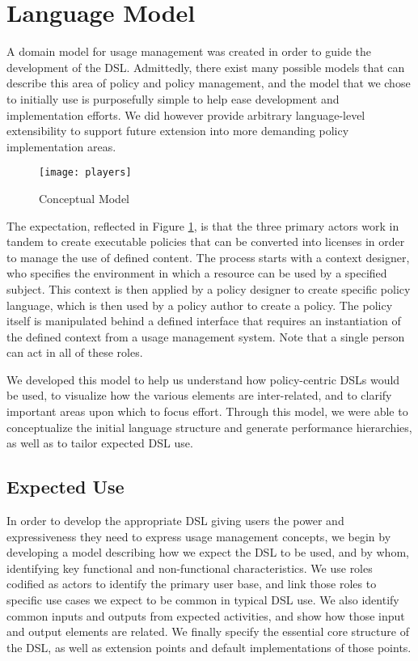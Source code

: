 \section{Language Model}\label{sec:model}
A domain model for usage management was created in order to guide the development of the DSL.  Admittedly, there exist many possible models that can describe this area of policy and policy management, and the model that we chose to initially use is purposefully simple to help ease development and implementation efforts.  We did however provide arbitrary language-level extensibility to support future extension into more demanding policy implementation areas.

\begin{figure}[!t]
\centering
\texttt{[image: players]}
\caption{Conceptual Model}
\label{fig:model:conceptual-model}
\end{figure}

The expectation, reflected in Figure \ref{fig:model:conceptual-model}, is that the three primary actors work in tandem to create executable policies that can be converted into licenses in order to manage the use of defined content.  The process starts with a context designer, who specifies the environment in which a resource can be used by a specified subject.  This context is then applied by a policy designer to create specific policy language, which is then used by a policy author to create a policy.  The policy itself is manipulated behind a defined interface that requires an instantiation of the defined context from a usage management system.  Note that a single person can act in all of these roles.

We developed this model to help us understand how policy-centric DSLs would be used, to visualize how the various elements are inter-related, and to clarify important areas upon which to focus effort.  Through this model, we were able to conceptualize the initial language structure and generate performance hierarchies, as well as to tailor expected DSL use.

\subsection{Expected Use}
In order to develop the appropriate DSL giving users the power and expressiveness they need to express usage management concepts, we begin by developing a model describing how we expect the DSL to be used, and by whom, identifying key functional and non-functional characteristics.  We use roles codified as actors to identify the primary user base, and link those roles to specific use cases we expect to be common in typical DSL use.  We also identify common inputs and outputs from expected activities, and show how those input and output elements are related.  We finally specify the essential core structure of the DSL, as well as extension points and default implementations of those points.

